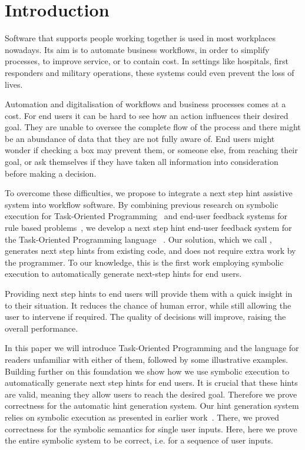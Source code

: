 
\section{Introduction}
\label{sec:intro}

Software that supports people working together is used in most workplaces nowadays.
Its aim is to automate business workflows, in order to simplify processes, to improve service, or to contain cost.
In settings like hospitals, first responders and military operations, these systems could even prevent the loss of lives.

Automation and digitalisation of workflows and business processes comes at a cost.
For end users it can be hard to see how an action influences their desired goal.
They are unable to oversee the complete flow of the process
and there might be an abundance of data that they are not fully aware of.
End users might wonder if checking a box may prevent them, or someone else, from reaching their goal,
or ask themselves if they have taken all information into consideration before making a decision.

To overcome these difficulties, we propose to integrate a next step hint assistive system into workflow software.
By combining previous research on symbolic execution for Task-Oriented Programming~\cite{Naus2019} and end-user feedback systems for rule based problems~\cite{DBLP:conf/sfp/NausJ16},
we develop a next step hint end-user feedback system for the Task-Oriented Programming language \TOPHAT~\cite{DBLP:conf/ppdp/SteenvoordenNK19}.
Our solution, which we call \ASTOPHAT, generates next step hints from existing code, and does not require extra work by the programmer.
To our knowledge, this is the first work employing symbolic execution to automatically generate next-step hints for end users.

Providing next step hints to end users will provide them with a quick insight in to their situation.
It reduces the chance of human error, while still allowing the user to intervene if required.
The quality of decisions will improve, raising the overall performance.

In this paper we will introduce Task-Oriented Programming and the \TOPHAT language for readers unfamiliar with either of them,
followed by some illustrative examples.
Building further on this foundation we show how we use symbolic execution to automatically generate next step hints for end users.
It is crucial that these hints are valid, meaning they allow users to reach the desired goal.
Therefore we prove correctness for the automatic hint generation system.
Our hint generation system relies on symbolic execution as presented in earlier work~\cite{Naus2019}.
There, we proved correctness for the symbolic semantics for single user inputs.
Here, here we prove the entire symbolic system to be correct, i.e. for a sequence of user inputs.


